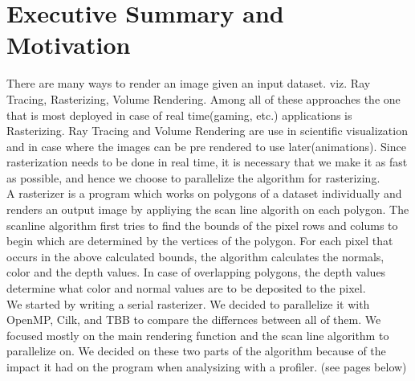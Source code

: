 \chapter*{Executive Summary and Motivation}

There are many ways to render an image given an input dataset. viz. Ray Tracing, Rasterizing, Volume Rendering.
Among all of these approaches the one that is most deployed in case of real time(gaming, etc.) applications is Rasterizing. Ray Tracing and Volume Rendering are use in scientific visualization and in case where the images can be pre rendered to use later(animations). Since rasterization needs to be done in real time, it is necessary that we make it as fast as possible, and hence we choose to parallelize the algorithm for rasterizing.
\\

A rasterizer is a program which works on polygons of a dataset individually and renders an output image by appliying the scan line algorith on each polygon. The scanline algorithm first tries to find the bounds of the pixel rows and colums to begin which are determined by the vertices of the polygon.
For each pixel that occurs in the above calculated bounds, the algorithm calculates the normals, color and the depth values. In case of overlapping polygons, the depth values determine what color and normal values are to be deposited to the pixel.
\\

We started by writing a serial rasterizer. We decided to parallelize it with OpenMP, Cilk, and TBB to compare the differnces between all of them. We focused mostly on the main rendering function and the scan line algorithm to parallelize on. We decided on these two parts of the algorithm because of the impact it had on the program when analysizing with a profiler. (see pages below)  
